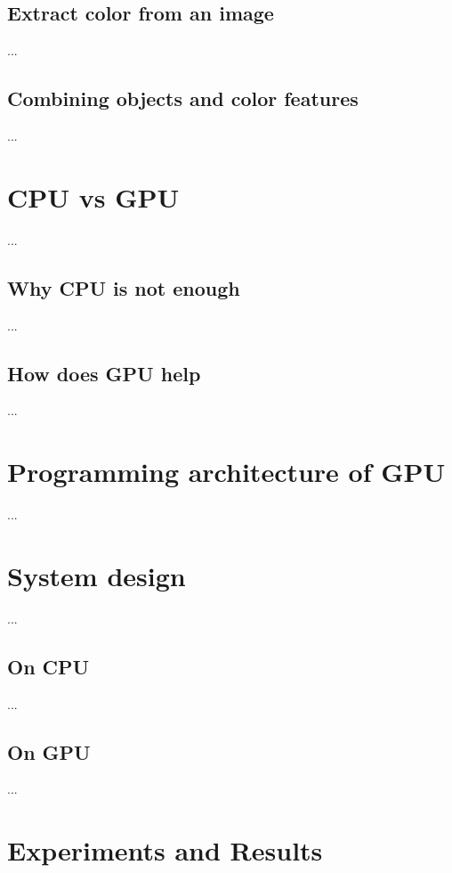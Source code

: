 \documentclass[english]{tktltiki}
\begin{document}
\subsection{Extract color from an image}

...

\subsection{Combining objects and color features}

...

\section{CPU vs GPU}

...


\subsection{Why CPU is not enough}

...


\subsection{How does GPU help}

...


\section{Programming architecture of GPU}

...


\section{System design}

...

\subsection{On CPU}

...


\subsection{On GPU}

...


\section{Experiments and Results}
\end{document}
